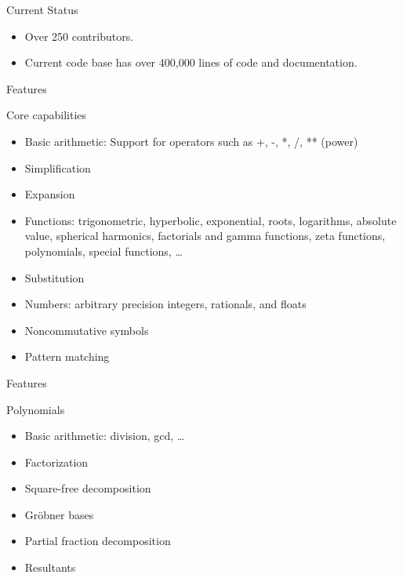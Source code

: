 \documentclass[xcolor=svgnames]{beamer}
\begin{document}
\begin{frame}
  \begin{block}{Current Status}
    \begin{itemize}
    \item Over 250 contributors.
    \item Current code base has over 400,000 lines of code and documentation.
    \end{itemize}
  \end{block}
\end{frame}

\begin{frame}{Features}
  \begin{block}{Core capabilities}
    \begin{itemize}
    \item Basic arithmetic: Support for operators such as +, -, *, /, ** (power)
    \item Simplification
    \item Expansion
    \item Functions: trigonometric, hyperbolic, exponential, roots, logarithms,
      absolute value, spherical harmonics, factorials and gamma functions, zeta
      functions, polynomials, special functions, \ldots
    \item Substitution
    \item Numbers: arbitrary precision integers, rationals, and floats
    \item Noncommutative symbols
    \item Pattern matching
    \end{itemize}
  \end{block}
\end{frame}

\begin{frame}{Features}
  \begin{block}{Polynomials}
    \begin{itemize}
    \item Basic arithmetic: division, gcd, \ldots
    \item Factorization
    \item Square-free decomposition
    \item Gröbner bases
    \item Partial fraction decomposition
    \item Resultants
    \end{itemize}
  \end{block}
\end{frame}
\end{document}
